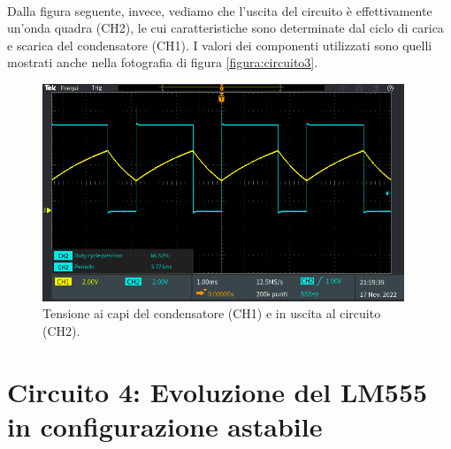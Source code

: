 \documentclass{report}
\begin{document}
\\Dalla figura seguente, invece, vediamo che l'uscita del circuito è effettivamente un'onda quadra (CH2), le cui caratteristiche sono determinate dal ciclo di carica e scarica del condensatore (CH1). I valori dei componenti utilizzati sono quelli mostrati anche nella fotografia di figura \ref{figura:circuito3}.
\begin{figure}[h!]
	\centering
	\includegraphics[height=6.5cm]{immagini/TEK00019}
	\caption{Tensione ai capi del condensatore (CH1) e in uscita al circuito (CH2).}
	\label{figura:TEK00019}
\end{figure}
\newpage
\section{Circuito 4: Evoluzione del LM555 in configurazione astabile}
\end{document}
